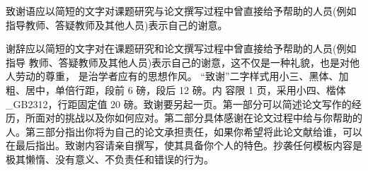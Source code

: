 

致谢语应以简短的文字对课题研究与论文撰写过程中曾直接给予帮助的人员(例如指导教师、答疑教师及其他人员)表示自己的谢意。
	
谢辞应以简短的文字对在课题研究和论文撰写过程中曾直接给予帮助的人员(例如指导 教师、答疑教师及其他人员)表示自己的谢意，这不仅是一种礼貌，也是对他人劳动的尊重， 是治学者应有的思想作风。
“致谢”二字样式用小三、黑体、加粗、居中，单倍行距，段前 6 磅，段后 12 磅。内 容限 1 页，采用小四、楷体\_GB2312，行距固定值 20 磅。致谢要另起一页。第一部分可以简述论文写作的经历，所面对的挑战以及你如何应对。第二部分具体感谢在论文过程中给与你帮助的人。第三部分指出你将为自己的论文承担责任，如果你希望将此论文献给谁，可以在最后指出。致谢内容请亲自撰写，使其具备你个人的特色。抄袭任何模板内容是极其懒惰、没有意义、不负责任和错误的行为。
	
